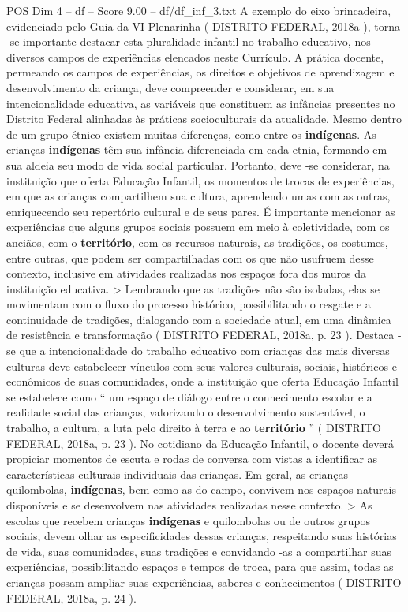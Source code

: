 \begin{textsample}{POS Dim 4 – df – Score 9.00 – df/df\_inf\_3.txt}
A exemplo do eixo brincadeira, evidenciado pelo Guia da VI Plenarinha ( DISTRITO FEDERAL, 2018a ), torna -se importante destacar esta pluralidade infantil no trabalho educativo, nos diversos campos de experiências elencados neste Currículo.
A prática docente, permeando os campos de experiências, os direitos e objetivos de aprendizagem e desenvolvimento da criança, deve compreender e considerar, em sua intencionalidade educativa, as variáveis que constituem as infâncias presentes no Distrito Federal alinhadas às práticas socioculturais da atualidade.
Mesmo dentro de um grupo étnico existem muitas diferenças, como entre os \textbf{indígenas}.
As crianças \textbf{indígenas} têm sua infância diferenciada em cada etnia, formando em sua aldeia seu modo de vida social particular.
Portanto, deve -se considerar, na instituição que oferta Educação Infantil, os momentos de trocas de experiências, em que as crianças compartilhem sua cultura, aprendendo umas com as outras, enriquecendo seu repertório cultural e de seus pares.
É importante mencionar as experiências que alguns grupos sociais possuem em meio à coletividade, com os anciãos, com o \textbf{território}, com os recursos naturais, as tradições, os costumes, entre outras, que podem ser compartilhadas com os que não usufruem desse contexto, inclusive em atividades realizadas nos espaços fora dos muros da instituição educativa. > Lembrando que as tradições não são isoladas, elas se movimentam com o fluxo do processo histórico, possibilitando o resgate e a continuidade de tradições, dialogando com a sociedade atual, em uma dinâmica de resistência e transformação ( DISTRITO FEDERAL, 2018a, p. 23 ).
Destaca -se que a intencionalidade do trabalho educativo com crianças das mais diversas culturas deve estabelecer vínculos com seus valores culturais, sociais, históricos e econômicos de suas comunidades, onde a instituição que oferta Educação Infantil se estabelece como “ um espaço de diálogo entre o conhecimento escolar e a realidade social das crianças, valorizando o desenvolvimento sustentável, o trabalho, a cultura, a luta pelo direito à terra e ao \textbf{território} ” ( DISTRITO FEDERAL, 2018a, p. 23 ).
No cotidiano da Educação Infantil, o docente deverá propiciar momentos de escuta e rodas de conversa com vistas a identificar as características culturais individuais das crianças.
Em geral, as crianças quilombolas, \textbf{indígenas}, bem como as do campo, convivem nos espaços naturais disponíveis e se desenvolvem nas atividades realizadas nesse contexto. > As escolas que recebem crianças \textbf{indígenas} e quilombolas ou de outros grupos sociais, devem olhar as especificidades dessas crianças, respeitando suas histórias de vida, suas comunidades, suas tradições e convidando -as a compartilhar suas experiências, possibilitando espaços e tempos de troca, para que assim, todas as crianças possam ampliar suas experiências, saberes e conhecimentos ( DISTRITO FEDERAL, 2018a, p. 24 ).

\end{textsample}
